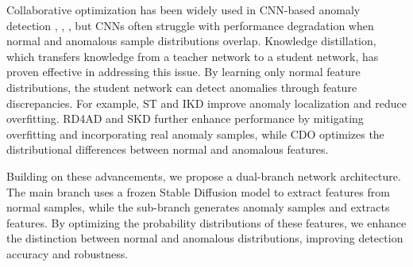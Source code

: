 Collaborative optimization has been widely used in CNN-based anomaly detection \cite{akccay2019skip}, \cite{defard2021padim}, \cite{roth2022towards}, but CNNs often struggle with performance degradation when normal and anomalous sample distributions overlap. Knowledge distillation, which transfers knowledge from a teacher network to a student network, has proven effective in addressing this issue. By learning only normal feature distributions, the student network can detect anomalies through feature discrepancies. For example, ST \cite{lin2017feature} and IKD \cite{hinton2015distilling} improve anomaly localization and reduce overfitting. RD4AD \cite{deng2022anomaly} and SKD \cite{li2021cutpaste} further enhance performance by mitigating overfitting and incorporating real anomaly samples, while CDO \cite{cao2023collaborative} optimizes the distributional differences between normal and anomalous features.

Building on these advancements, we propose a dual-branch network architecture. The main branch uses a frozen Stable Diffusion model to extract features from normal samples, while the sub-branch generates anomaly samples and extracts features. By optimizing the probability distributions of these features, we enhance the distinction between normal and anomalous distributions, improving detection accuracy and robustness.